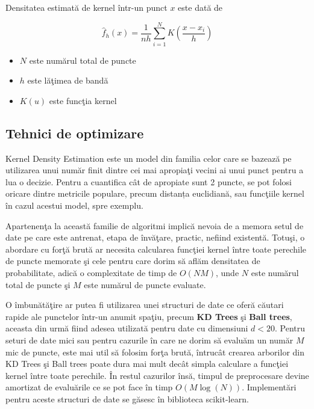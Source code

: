 Densitatea estimată de kernel într-un punct $x$ este dată de

\begin{equation}
\hat{f}_h(x) = \frac{1}{nh} \sum_{i=1}^{N} K\left(\frac{x - x_i}{h}\right)
\end{equation}

\begin{itemize}
    \item $N$ este numărul total de puncte
    \item $h$ este lăţimea de bandă
    \item $K(u)$ este funcţia kernel 
\end{itemize}

\subsection{Tehnici de optimizare}

Kernel Density Estimation este un model din familia celor care 
se bazează pe utilizarea unui număr finit 
dintre cei mai apropiaţi vecini ai unui punct pentru a lua 
o decizie. Pentru a cuantifica cât de apropiate sunt 2 puncte, 
se pot folosi oricare dintre metricile populare, precum distanța 
euclidiană, sau funcţiile kernel în cazul acestui model, spre exemplu.

Apartenenţa la această familie de algoritmi implică nevoia de a memora
setul de date pe care este antrenat, etapa de învăţare, practic, nefiind 
existentă. Totuşi, o abordare cu forţă brută ar necesita calcularea 
funcţiei kernel între toate perechile de puncte memorate şi cele pentru 
care dorim să aflăm densitatea de probabilitate, adică o complexitate de timp 
de $O(NM)$, unde $N$ este numărul total de puncte şi $M$ este numărul de puncte 
evaluate.

O îmbunătăţire ar putea fi utilizarea unei structuri de date ce oferă 
căutari rapide ale punctelor într-un anumit spaţiu, precum \textbf{KD Trees} 
şi \textbf{Ball trees}, aceasta din urmă fiind adesea utilizată pentru date cu 
dimensiuni $d < 20$. Pentru seturi de date mici sau pentru cazurile în care 
ne dorim să evaluăm un număr $M$ mic de puncte, este mai util să folosim forţa 
brută, întrucât crearea arborilor din KD Trees şi Ball trees 
poate dura mai mult decât simpla calculare a funcţiei kernel între toate 
perechile. În restul cazurilor însă, timpul de preprocesare devine amortizat 
de evaluările ce se pot face în timp $O(M\log(N))$. Implementări pentru 
aceste structuri de date se găsesc în biblioteca scikit-learn\cite{scikit-learn}.

